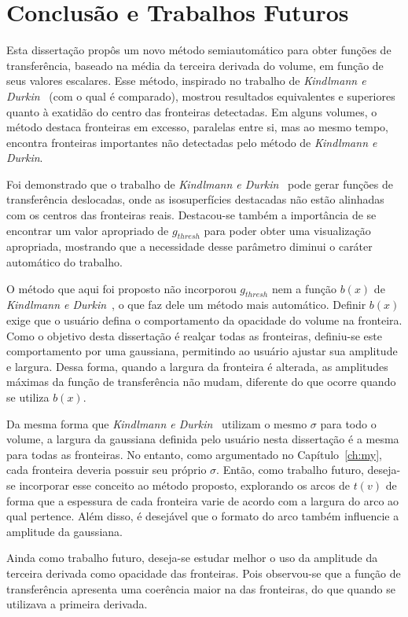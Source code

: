 
\chapter{Conclusão e Trabalhos Futuros}
\label{ch:conclusion}
	Esta dissertação propôs um novo método semiautomático para obter funções de transferência, baseado na média da terceira derivada do volume, em função de seus valores escalares. Esse método, inspirado no trabalho de \textit{Kindlmann e Durkin}~\cite{gordon} (com o qual é comparado), mostrou resultados equivalentes e superiores quanto à exatidão do centro das fronteiras detectadas. Em alguns volumes, o método destaca fronteiras em excesso, paralelas entre si, mas ao mesmo tempo, encontra fronteiras importantes não detectadas pelo método de \textit{Kindlmann e Durkin}.

	Foi demonstrado que o trabalho de \textit{Kindlmann e Durkin}~\cite{gordon} pode gerar funções de transferência deslocadas, onde as isosuperfícies destacadas não estão alinhadas com os centros das fronteiras reais. Destacou-se também a importância de se encontrar um valor apropriado de $ g_{thresh} $ para poder obter uma visualização apropriada, mostrando que a necessidade desse parâmetro diminui o caráter automático do trabalho.
	
	O método que aqui foi proposto não incorporou $ g_{thresh} $ nem a função $ b(x) $ de \textit{Kindlmann e Durkin}~\cite{gordon}, o que faz dele um método mais automático. Definir $ b(x) $ exige que o usuário defina o comportamento da opacidade do volume na fronteira. Como o objetivo desta dissertação é realçar todas as fronteiras, definiu-se este comportamento por uma gaussiana, permitindo ao usuário ajustar sua amplitude e largura. Dessa forma, quando a largura da fronteira é alterada, as amplitudes máximas da função de transferência não mudam, diferente do que ocorre quando se utiliza $ b(x) $.
	
	Da mesma forma que \textit{Kindlmann e Durkin}~\cite{gordon} utilizam o mesmo $ \sigma $ para todo o volume, a largura da gaussiana definida pelo usuário nesta dissertação é a mesma para todas as fronteiras. No entanto, como argumentado no Capítulo~\ref{ch:my}, cada fronteira deveria possuir seu próprio $ \sigma $. Então, como trabalho futuro, deseja-se incorporar esse conceito ao método proposto, explorando os arcos de $ t(v) $ de forma que a espessura de cada fronteira varie de acordo com a largura do arco ao qual pertence. Além disso, é desejável que o formato do arco também influencie a amplitude da gaussiana.
	
	Ainda como trabalho futuro, deseja-se estudar melhor o uso da amplitude da terceira derivada como opacidade das fronteiras. Pois observou-se que a função de transferência apresenta uma coerência maior na  das fronteiras, do que quando se utilizava a primeira derivada.